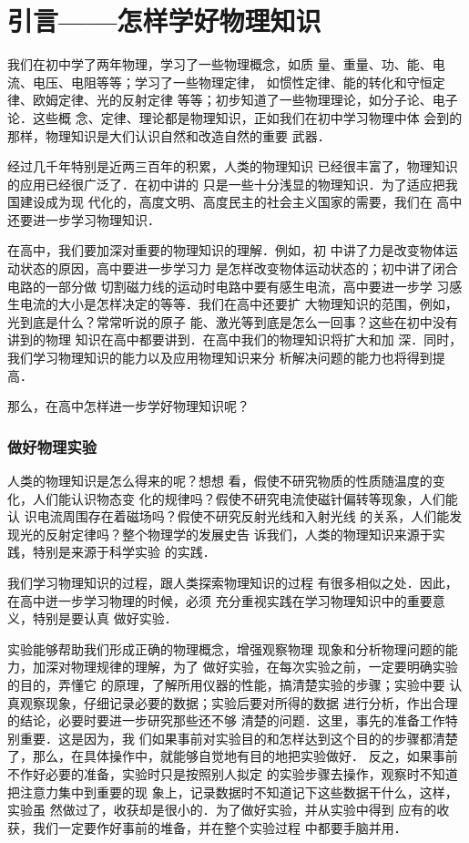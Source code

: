 \chapter{引言——怎样学好物理知识}

我们在初中学了两年物理，学习了一些物理概念，如质
量、重量、功、能、电流、电压、电阻等等；学习了一些物理定律，
如惯性定律、能的转化和守恒定律、欧姆定律、光的反射定律
等等；初步知道了一些物理理论，如分子论、电子论．这些概
念、定律、理论都是物理知识，正如我们在初中学习物理中体
会到的那样，物理知识是大们认识自然和改造自然的重要
武器．

经过几千年特别是近两三百年的积累，人类的物理知识
已经很丰富了，物理知识的应用已经很广泛了．在初中讲的
只是一些十分浅显的物理知识．为了适应把我国建设成为现
代化的，高度文明、高度民主的社会主义国家的需要，我们在
高中还要进一步学习物理知识．

    在高中，我们要加深对重要的物理知识的理解．例如，初
中讲了力是改变物体运动状态的原因，高中要进一步学习力
是怎样改变物体运动状态的；初中讲了闭合电路的一部分做
切割磁力线的运动时电路中要有感生电流，高中要进一步学
习感生电流的大小是怎样决定的等等．我们在高中还要扩
大物理知识的范围，例如，光到底是什么？常常听说的原子
能、激光等到底是怎么一回事？这些在初中没有讲到的物理
知识在高中都要讲到．在高中我们的物理知识将扩大和加
深．同时，我们学习物理知识的能力以及应用物理知识来分
析解决问题的能力也将得到提高．

    那么，在高中怎样进一步学好物理知识呢？

\subsection*{做好物理实验}
人类的物理知识是怎么得来的呢？想想
看，假使不研究物质的性质随温度的变化，人们能认识物态变
化的规律吗？假使不研究电流使磁针偏转等现象，人们能认
识电流周围存在着磁场吗？假使不研究反射光线和入射光线
的关系，人们能发现光的反射定律吗？整个物理学的发展史告
诉我们，人类的物理知识来源于实践，特别是来源于科学实验
的实践．

    我们学习物理知识的过程，跟人类探索物理知识的过程
有很多相似之处．因此，在高中迸一步学习物理的时候，必须
充分重视实践在学习物理知识中的重要意义，特别是要认真
做好实验．

    实验能够帮助我们形成正确的物理概念，增强观察物理
现象和分析物理问题的能力，加深对物理规律的理解，为了
做好实验，在每次实验之前，一定要明确实验的目的，弄懂它
的原理，了解所用仪器的性能，搞清楚实验的步骤；实验中要
认真观察现象，仔细记录必要的数据；实验后要对所得的数据
进行分析，作出合理的结论，必要时要进一步研究那些还不够
清楚的问题．这里，事先的准备工作特别重要．这是因为，我
们如果事前对实验目的和怎样达到这个目的的步骤都清楚
了，那么，在具体操作中，就能够自觉地有目的地把实验做好．
反之，如果事前不作好必要的准备，实验时只是按照别人拟定
的实验步骤去操作，观察时不知道把注意力集中到重要的现
象上，记录数据时不知道记下这些数据干什么，这样，实验虽
然做过了，收获却是很小的．为了做好实验，并从实验中得到
应有的收获，我们一定要作好事前的堆备，并在整个实验过程
中都要手脑并用．

